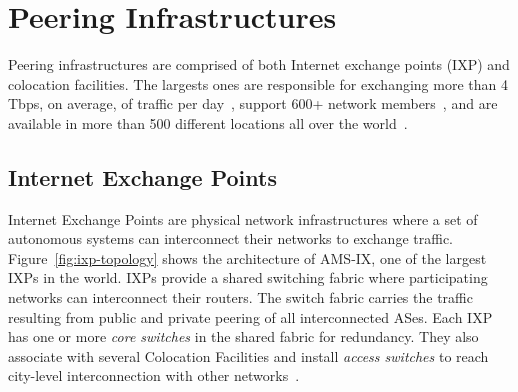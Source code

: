 \chapter{Peering Infrastructures}\label{cap:background}
\thispagestyle{empty}



	Peering infrastructures are comprised of both Internet exchange points (IXP) and colocation facilities. The largests ones are responsible for exchanging more than 4 Tbps, on average, of traffic per day~\cite{decixstatistics}, support 600+ network members~\cite{ixbrmembros}, and are available in more than 500 different locations all over the world~\cite{amsixlocations}.


	\section{Internet Exchange Points}
	\label{subsec:ixp}

	Internet Exchange Points are physical network infrastructures where a set of autonomous systems can interconnect their networks to exchange traffic. Figure~\ref{fig:ixp-topology} shows the architecture of AMS-IX, one of the largest IXPs in the world. IXPs provide a shared switching fabric where participating networks can interconnect their routers. The switch fabric carries the traffic resulting from public and private peering of all interconnected ASes. Each IXP has one or more \emph{core switches} in the shared fabric for redundancy. They also associate with several Colocation Facilities and install \emph{access switches} to reach city-level interconnection with other networks~\cite{Giotsas:2015:MPI:2716281.2836122}.


